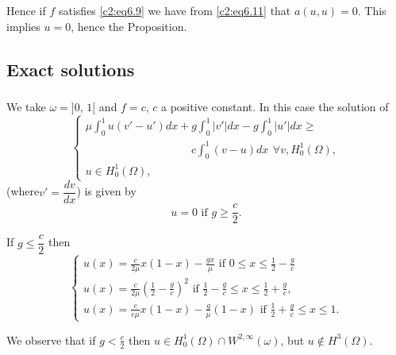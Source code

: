 Hence if $f$ satisfies \eqref{c2:eq6.9} we have from \eqref{c2:eq6.11}  
that $a(u, u) = 0$. This implies $u = 0$, hence the Proposition. 

\subsection{Exact solutions}\label{c2:ss6.5}%

\subsubsection{}\label{c2:sss6.5.1}%

\setcounter{example}{0}
\begin{example}\label{c2:sss6.5.1:ex1} %
We take $\omega = ] 0$, $1 [$ and $f = c$, $c$ a positive constant. In
    this case the solution of    
\begin{equation}
\begin{cases}
\mu \int^1_0 u (v'- u') dx + g \int^1_0 | v' | dx - g \int^1_0 | u' |
dx \geq\\ 
\hspace{4cm} c \int^1_0 (v - u) dx ~\, \forall  v , H^1_0 (\Omega ), \\ 
u \in H^1_0 (\Omega ),
\end{cases}
\tag{6.12}\label{c2:eq6.12}
\end{equation}
(where\pageoriginale  $v' = \dfrac{dv}{dx}$) is given by 
\begin{equation}
u = 0 \text{ if } g \geq \frac{c}{2}\tag{6.13}.\label{c2:eq6.13}
\end{equation}
\end{example}

If $g \leq \dfrac{c}{2}$ then 
\begin{equation}
\begin{cases}
u (x) = \frac{c}{2 \mu} x (1 - x)- \frac{gx}{\mu} \text{ if } 0 \leq x
\leq \frac{1}{2} - \frac{g}{c}\\ 
u (x) = \frac{c}{2 \mu}  (\frac{1}{2}- \frac{g}{c})^2 \text{ if }
\frac{1}{2} - \frac{g}{c} \leq x \leq \frac{1}{2} + \frac{g}{c}, \\ 
u(x) = \frac{c}{e \mu} x (1- x )- \frac{g}{\mu} (1 - x) \text{ if }
\frac{1}{2} + \frac{g}{c} \leq x \leq 1. 
\end{cases}
\tag{6.14}\label{c2:eq6.14}
\end{equation}

We observe that if $g < \frac{c}{2}$ then $u \in H^1_0 (\Omega )
\cap W^{2, \infty } (\omega )$, but $u \notin H^3 (\Omega)$. 

